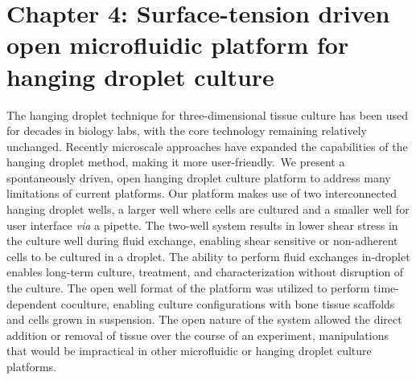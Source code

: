\chapter{Chapter 4: Surface-tension driven open microfluidic platform for hanging droplet culture}\label{Chap:HangingDroplet}

The hanging droplet technique for three-dimensional tissue culture has been used for decades in biology labs, with the core technology remaining relatively unchanged. Recently microscale approaches have expanded the capabilities of the hanging droplet method, making it more user-friendly. We present a spontaneously driven, open hanging droplet culture platform to address many limitations of current platforms. Our platform makes use of two interconnected hanging droplet wells, a larger well where cells are cultured and a smaller well for user interface \textit{via} a pipette. The two-well system results in lower shear stress in the culture well during fluid exchange, enabling shear sensitive or non-adherent cells to be cultured in a droplet. The ability to perform fluid exchanges in-droplet enables long-term culture, treatment, and characterization without disruption of the culture. The open well format of the platform was utilized to perform time-dependent coculture, enabling culture configurations with bone tissue scaffolds and cells grown in suspension. The open nature of the system allowed the direct addition or removal of tissue over the course of an experiment, manipulations that would be impractical in other microfluidic or hanging droplet culture platforms. 


